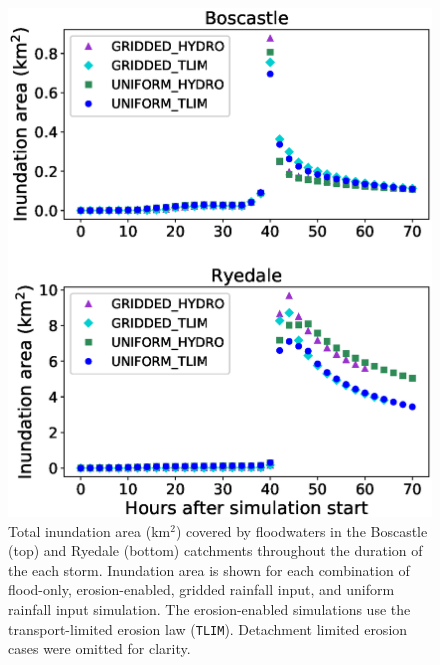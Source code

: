 \begin{figure}[!htbp]
\includegraphics[width=12cm]{chp_flood_figs_scripts/inundation_area.eps}
\caption{Total inundation area (km$^2$) covered by floodwaters in the Boscastle (top) and Ryedale (bottom) catchments throughout the duration of the each storm. Inundation area is shown for each combination of flood-only, erosion-enabled, gridded rainfall input, and uniform rainfall input simulation. The erosion-enabled simulations use the transport-limited erosion law (\texttt{TLIM}). Detachment limited erosion cases were omitted for clarity.}
\label{fig_inundation_area_ensemble}
\end{figure}

